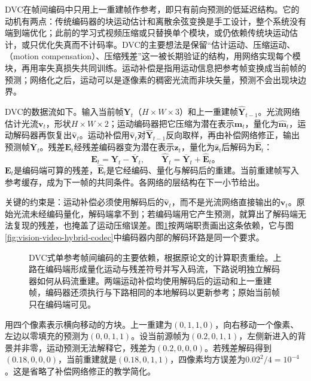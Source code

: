 DVC在帧间编码中只用上一重建帧作参考，即只有前向预测的低延迟结构。它的动机有两点：传统编码器的块运动估计和离散余弦变换是手工设计，整个系统没有端到端优化；此前的学习式视频压缩或只替换单个模块，或仍依赖传统块运动估计，或只优化失真而不计码率。DVC的主要想法是保留“估计运动、压缩运动、（motion compensation）、压缩残差”这一被长期验证的结构，用网络实现每个模块，再用率失真损失共同训练。运动补偿是指用运动信息把参考帧变换成当前帧的预测；网络化之后，运动可以是逐像素的稠密光流而非块矢量，预测不会出现块边界。

DVC的数据流如下。输入当前帧$\bm{Y}_t$（$H\times W\times3$）和上一重建帧$\widehat{\bm{Y}}_{t-1}$。光流网络估计光流$\bm{v}_t$，形状$H\times W\times2$；运动编码器把它压缩为潜在表示$\bm{m}_t$，量化为$\widehat{\bm{m}}_t$，运动解码器再恢复出$\widehat{\bm{v}}_t$。运动补偿用$\widehat{\bm{v}}_t$对$\widehat{\bm{Y}}_{t-1}$反向取样，再由补偿网络修正，输出预测帧$\overline{\bm{Y}}_t$。残差$\bm{E}_t$经残差编码器变为潜在表示$\bm{z}_t$，量化为$\widehat{\bm{z}}_t$后解码为$\widehat{\bm{E}}_t$：
\begin{equation}
  \bm{E}_t=\bm{Y}_t-\overline{\bm{Y}}_t,\qquad
  \widehat{\bm{Y}}_t=\overline{\bm{Y}}_t+\widehat{\bm{E}}_t\text{。}
  \label{eq:vision-video-dvc-reconstruction}
\end{equation}
$\bm{E}_t$是编码端可算的残差，$\widehat{\bm{E}}_t$是它经编码、量化与解码后的重建。当前重建帧写入参考缓存，成为下一帧的共同条件。各网络的层结构在下一小节给出。

关键的约束是：运动补偿必须使用解码后的$\widehat{\bm{v}}_t$，而不是光流网络直接输出的$\bm{v}_t$。原始光流未经编码量化，解码端拿不到；若编码端用它产生预测，就算出了解码端无法复现的残差，也掩盖了运动压缩误差。图\ref{fig:vision-dvc-reference}按两端职责画出这条依赖，它与图\ref{fig:vision-video-hybrid-codec}中编码器内部的解码环路是同一个要求。

\begin{figure}[tbp]
  \centering
  
  \caption{DVC式单参考帧间编码的主要依赖，根据原论文的计算职责重绘。上路在编码端形成量化运动与残差符号并写入码流，下路说明独立解码器如何从码流重建。两端运动补偿均使用解码后的运动和上一重建帧，编码器还须执行与下路相同的本地解码以更新参考；原始当前帧只在编码端可见。}
  \label{fig:vision-dvc-reference}
\end{figure}
\FloatBarrier

用四个像素表示横向移动的方块。上一重建为$(0,1,1,0)$，向右移动一个像素、左边以零填充的预测为$(0,0,1,1)$。设当前源帧为$(0.2,0,1,1)$，左侧新进入的背景并非零，运动预测无法解释它，残差为$(0.2,0,0,0)$。若残差解码得到$(0.18,0,0,0)$，当前重建就是$(0.18,0,1,1)$，四像素均方误差为$0.02^2/4=10^{-4}$。这是省略了补偿网络修正的教学简化。

